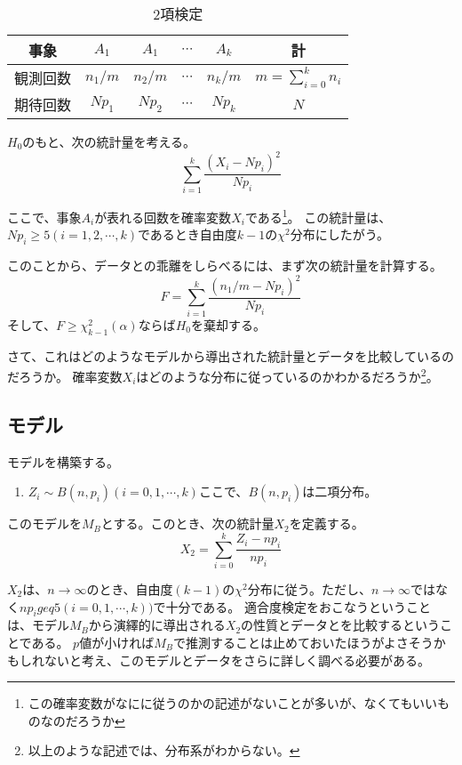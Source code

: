 \fi

\begin{table}[hbtp]
 \caption{2項検定}
 \label{table:binomial_test}
 \centering
 \begin{tabular}{c|cccc|c}
  事象 & $A_1$ & $A_1$ & $\cdots$ & $A_k$ & 計 \\    \hline \hline
  観測回数 & $n_1/m$ & $n_2/m$ & $\cdots$ & $n_k/m$ &  $m=\sum_{i=0}^{k} n_i $ \\
  期待回数 & $N p_1$ & $N p_2$ & $\cdots$ & $N p_k$ &  $N$ 
 \end{tabular}
\end{table}


$H_0$のもと、次の統計量を考える。
\begin{equation*}
 \sum_{i=1}^{k} \frac{(X_i - N p_i)^2}{N p_i}
\end{equation*}


ここで、事象$A_i$が表れる回数を確率変数$X_i$である\footnote{この確率変数がなにに従うのかの記述がないことが多いが、なくてもいいものなのだろうか}。
この統計量は、$N p_i \geq 5 (i=1,2,\cdots, k)$であるとき自由度$k-1$の$\chi^2$分布にしたがう。

このことから、データとの乖離をしらべるには、まず次の統計量を計算する。
\begin{equation*}
 F=\sum_{i=1}^{k} \frac{(n_1/m- N p_i)^2}{N p_i}
\end{equation*}
そして、$F \geq \chi^2_{k-1}(\alpha)$ならば$H_0$を棄却する。


さて、これはどのようなモデルから導出された統計量とデータを比較しているのだろうか。
確率変数$X_i$はどのような分布に従っているのかわかるだろうか\footnote{以上のような記述では、分布系がわからない。}。

\subsection{モデル}
モデルを構築する。
\begin{enumerate}
 \item $Z_i \sim B(n,p_i) (i=0,1,\cdots,k) $ここで、$B(n,p_i)$は二項分布。
\end{enumerate}
このモデルを$M_B$とする。このとき、次の統計量$X_2$を定義する。
\begin{equation*}
 X_2 = \sum_{i=0}^{k} \frac{Z_i-n p_i}{n p_i}
\end{equation*}


$X_2$は、$n\rightarrow \infty$のとき、自由度$(k-1)$の$\chi^2$分布に従う。ただし、$n\rightarrow \infty$ではなく$n p_i geq 5 (i=0,1,\cdots,k))$で十分である\cite{1050850569142531968}。
適合度検定をおこなうということは、モデル$M_B$から演繹的に導出される$X_2$の性質とデータとを比較するということである。
$p$値が小ければ$M_B$で推測することは止めておいたほうがよさそうかもしれないと考え、このモデルとデータをさらに詳しく調べる必要がある。

